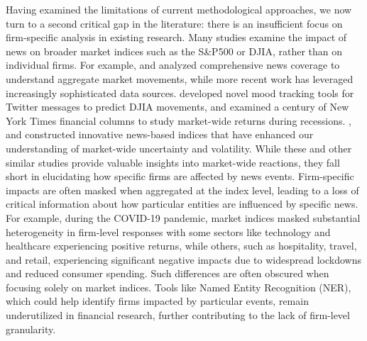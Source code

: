 \mx
Having examined the limitations of current methodological approaches, we now turn to a second critical gap in the literature: there is an insufficient focus on firm-specific analysis in existing research. Many studies examine the impact of news on broader market indices
 such as the S\&P500 or DJIA, rather than on individual firms. 
For example, 
\cite{cutler1988moves} %
and 
\cite{mitchell1994impact} %
analyzed comprehensive news coverage to understand aggregate market movements, while more recent work has leveraged increasingly sophisticated data sources. 
\cite{bollen2011twitter} %
developed novel mood tracking tools for Twitter messages to predict DJIA movements, and 
\cite{garcia2013sentiment} %
examined a century of New York Times financial columns to study market-wide returns during recessions. 
\cite{baker2016measuring}, \cite{baker2021triggers} %
and 
\cite{manela2017news} %
constructed innovative news-based indices that have enhanced our understanding of market-wide uncertainty and volatility.
While these and other similar studies provide valuable insights into market-wide reactions, they fall short in elucidating how specific firms are affected by news events. Firm-specific impacts are often masked when aggregated at the index level, leading to a loss of critical information about how particular entities are influenced by specific news. 
For example, during the COVID-19 pandemic, market indices masked substantial heterogeneity in firm-level responses
 with some sectors like technology and healthcare experiencing positive returns, while others, such as hospitality, travel, and retail, experiencing significant negative impacts due to widespread lockdowns and reduced consumer spending. 
Such differences are often obscured when focusing solely on market indices. Tools like Named Entity Recognition (NER), which could help identify firms impacted by particular events, remain underutilized in financial research, further contributing to the lack of firm-level granularity.


